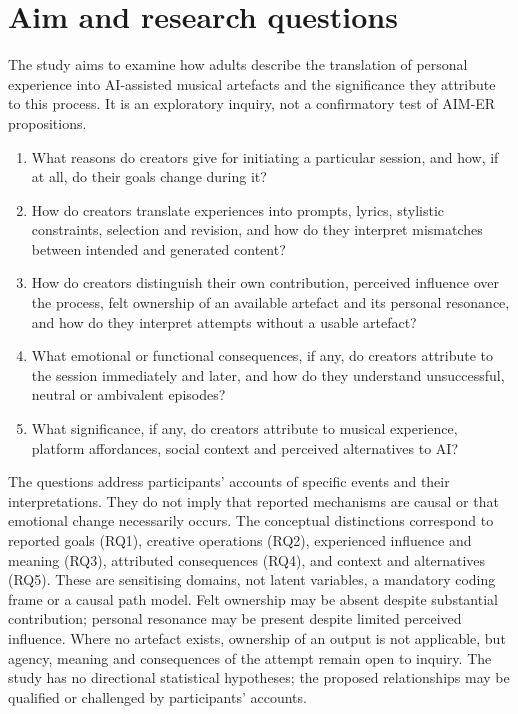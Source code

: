 \section{Aim and research questions}
The study aims to examine how adults describe the translation of personal experience into AI-assisted musical artefacts and the significance they attribute to this process. It is an exploratory inquiry, not a confirmatory test of AIM-ER propositions.
\begin{enumerate}
\item[RQ1.] What reasons do creators give for initiating a particular session, and how, if at all, do their goals change during it?
\item[RQ2.] How do creators translate experiences into prompts, lyrics, stylistic constraints, selection and revision, and how do they interpret mismatches between intended and generated content?
\item[RQ3.] How do creators distinguish their own contribution, perceived influence over the process, felt ownership of an available artefact and its personal resonance, and how do they interpret attempts without a usable artefact?
\item[RQ4.] What emotional or functional consequences, if any, do creators attribute to the session immediately and later, and how do they understand unsuccessful, neutral or ambivalent episodes?
\item[RQ5.] What significance, if any, do creators attribute to musical experience, platform affordances, social context and perceived alternatives to AI?
\end{enumerate}
The questions address participants' accounts of specific events and their interpretations. They do not imply that reported mechanisms are causal or that emotional change necessarily occurs. The conceptual distinctions correspond to reported goals (RQ1), creative operations (RQ2), experienced influence and meaning (RQ3), attributed consequences (RQ4), and context and alternatives (RQ5). These are sensitising domains, not latent variables, a mandatory coding frame or a causal path model. Felt ownership may be absent despite substantial contribution; personal resonance may be present despite limited perceived influence. Where no artefact exists, ownership of an output is not applicable, but agency, meaning and consequences of the attempt remain open to inquiry. The study has no directional statistical hypotheses; the proposed relationships may be qualified or challenged by participants' accounts.
